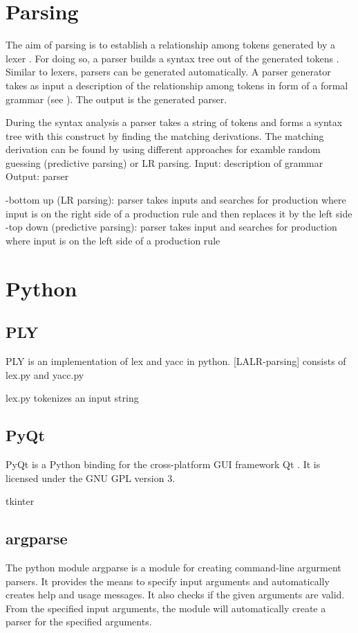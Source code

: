 

\section{Parsing}\label{sec:BackgroundParser}
The aim of parsing is to establish a relationship among tokens generated by a lexer \cite{LexYacc.1992}. For doing so, a parser builds a syntax tree out of the generated tokens \cite{Mogensen.2017}.\\
Similar to lexers, parsers can be generated automatically.
A parser generator takes as input a description of the relationship among tokens in form of a formal grammar (see ). The output is the generated parser. \cite{LexYacc.1992}

During the syntax analysis a parser takes a string of tokens and forms a syntax tree with this construct by finding the matching derivations. The matching derivation can be found by using different approaches for examble random guessing (predictive parsing) or LR parsing.
Input: description of grammar \cite{LexYacc.1992}
Output: parser \cite{LexYacc.1992}

-bottom up (LR parsing):
parser takes inputs and searches for production where input is on the right side of a production rule and then replaces it by the left side
-top down (predictive parsing):
parser takes input and searches for production where input is on the left side of a production rule

\section{Python}\label{sec:BackgroundPython}
\subsection{PLY}\label{sec:BackgroundPythonPLY}

\acf{PLY} \cite{PLY} is an implementation of lex and yacc in python.
[LALR-parsing]
consists of lex.py and yacc.py

lex.py tokenizes an input string\
\subsection{PyQt}\label{sec:BackgroundPytonPyQt}
PyQt is a Python binding for the cross-platform GUI framework Qt \cite{PyQt}.
It is licensed under the GNU GPL version 3.


tkinter
\subsection{argparse}\label{sec:BackgroundArgparse}
The python module argparse \cite{argparse} is a module for creating command-line argurment parsers.
It provides the means to specify input arguments and automatically creates help and usage messages.
It also checks if the given arguments are valid.
From the specified input arguments, the module will automatically create a parser for the specified arguments.